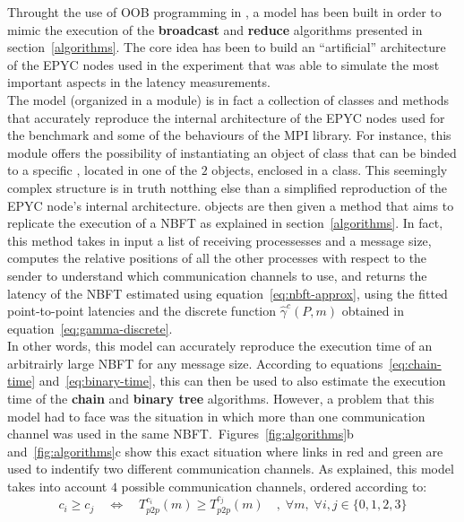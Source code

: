 \documentclass[../main.tex]{subfiles}
\begin{document}
Throught the use of OOB programming in , a model has been built in order to mimic the execution of the \textbf{broadcast} and \textbf{reduce} algorithms presented in section~\ref{algorithms}. 
The core idea has been to build an ``artificial'' architecture of the EPYC nodes used in the experiment that was able to simulate the most important aspects in the latency measurements.\\
The model (organized in a  module) is in fact a collection of classes and methods that accurately reproduce the internal architecture of the EPYC nodes used for the benchmark and some of the behaviours of the MPI library.
For instance, this module offers the possibility of instantiating an object of class  that can be binded to a specific , located in one of the $2$  objects, enclosed in a  class. This seemingly complex structure is in truth notthing else than a simplified reproduction of the EPYC node's internal architecture.  objects are then given a  method that aims to replicate the execution of a NBFT as explained in section~\ref{algorithms}. In fact, this method takes in input a list of receiving processesses and a message size, computes the relative positions of all the other processes with respect to the sender to understand which communication channels to use, and returns the latency of the NBFT estimated using equation~\ref{eq:nbft-approx}, using the fitted point-to-point latencies and the discrete function $\widehat{\gamma}^{c}(P,m)$ obtained in equation~\ref{eq:gamma-discrete}.\\
In other words, this model can accurately reproduce the execution time of an arbitrairly large NBFT for any message size. According to equations~\ref{eq:chain-time} and~\ref{eq:binary-time}, this can then be used to also estimate the execution time of the \textbf{chain} and \textbf{binary tree} algorithms. However, a problem that this model had to face was the situation in which more than one communication channel was used in the same NBFT.\ Figures~\ref{fig:algorithms}b and~\ref{fig:algorithms}c show this exact situation where links in red and green are used to indentify two different communication channels. As explained, this model takes into account $4$ possible communication channels, ordered according to:
\begin{equation}\label{eq:channels-order}
c_i \geq c_j \quad \Leftrightarrow \quad T^{c_{i}}_{p2p}(m) \geq T^{c_{j}}_{p2p}(m) \quad ,\; \forall m,\; \forall i,j \in \{0,1,2,3\}
\end{equation}
\end{document}
